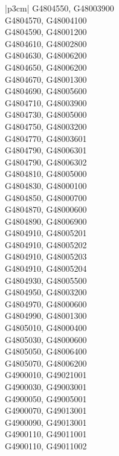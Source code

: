 \begin{customLongTable}{ |p{3cm}| }
G4804550, G48003900 \\ \hline
G4804570, G48004100 \\ \hline
G4804590, G48001200 \\ \hline
G4804610, G48002800 \\ \hline
G4804630, G48006200 \\ \hline
G4804650, G48006200 \\ \hline
G4804670, G48001300 \\ \hline
G4804690, G48005600 \\ \hline
G4804710, G48003900 \\ \hline
G4804730, G48005000 \\ \hline
G4804750, G48003200 \\ \hline
G4804770, G48003601 \\ \hline
G4804790, G48006301 \\ \hline
G4804790, G48006302 \\ \hline
G4804810, G48005000 \\ \hline
G4804830, G48000100 \\ \hline
G4804850, G48000700 \\ \hline
G4804870, G48000600 \\ \hline
G4804890, G48006900 \\ \hline
G4804910, G48005201 \\ \hline
G4804910, G48005202 \\ \hline
G4804910, G48005203 \\ \hline
G4804910, G48005204 \\ \hline
G4804930, G48005500 \\ \hline
G4804950, G48003200 \\ \hline
G4804970, G48000600 \\ \hline
G4804990, G48001300 \\ \hline
G4805010, G48000400 \\ \hline
G4805030, G48000600 \\ \hline
G4805050, G48006400 \\ \hline
G4805070, G48006200 \\ \hline
G4900010, G49021001 \\ \hline
G4900030, G49003001 \\ \hline
G4900050, G49005001 \\ \hline
G4900070, G49013001 \\ \hline
G4900090, G49013001 \\ \hline
G4900110, G49011001 \\ \hline
G4900110, G49011002 \\ \hline

\end{customLongTable}
